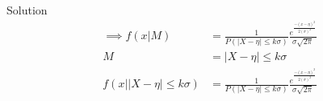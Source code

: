 \documentclass{beamer}
\begin{document}
\begin{frame}{Solution}
\begin{align}
\implies f(x|M) &= \frac{1}{P(|X-\eta|\leq k\sigma)}\frac{e^{\frac{-(x-\eta)^{2}}{2(\sigma)^{2}}}}{\sigma \sqrt{2\pi}}\\
M &= |X - \eta|\leq k\sigma\\
f(x||X-\eta|\leq k \sigma ) &= \frac{1}{P(|X-\eta|\leq k\sigma)}\frac{e^{\frac{-(x-\eta)^{2}}{2(\sigma)^{2}}}}{\sigma \sqrt{2\pi}}
\end{align}
\end{frame}
\end{document}
